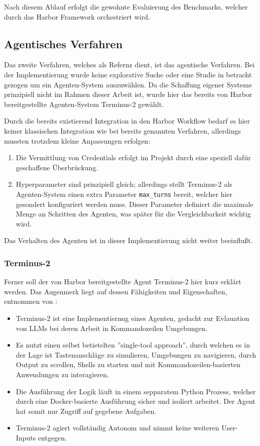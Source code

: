 Nach diesem Ablauf erfolgt die gewohnte Evaluierung des Benchmarks, welcher durch das Harbor Framework orchestriert wird.

\subsection{Agentisches Verfahren}\label{ch:Impl:Agentisches Verfahren}

Das zweite Verfahren, welches als Refernz dient, ist das agentische Verfahren. Bei der Implementierung wurde keine explorative Suche oder eine Studie in betracht gezogen um ein Agenten-System auszuwählen. Da die Schaffung eigener Systeme prinzipiell nicht im Rahmen dieser Arbeit ist, wurde hier das bereits von Harbor bereitgestellte Agenten-System Terminus-2 \cite{Terminus2} gewählt.

Durch die bereits existierend Integration in den Harbor Workflow bedarf es hier keiner klassischen Integration wie bei bereits genannten Verfahren, allerdings mussten trotzdem kleine Anpassungen erfolgen:

\begin{enumerate}
    \item Die Vermittlung von Credentials erfolgt im Projekt durch eine speziell dafür geschaffene Überbrückung.
    \item Hyperparameter sind prinzipiell gleich; allerdings stellt Terminus-2 als Agenten-System einen extra Parameter \texttt{max\_turns} bereit, welcher hier gesondert konfiguriert werden muss. Dieser Parameter definiert die maximale Menge an Schritten des Agenten, was später für die Vergleichbarkeit wichtig wird.
\end{enumerate}

Das Verhalten des Agenten ist in dieser Implementierung nicht weiter beeinflußt.

\subsubsection{Terminus-2}

Ferner soll der von Harbor bereitgestellte Agent Terminus-2 hier kurz erklärt werden. Das Augenmerk liegt auf dessen Fähigkeiten und Eigenschaften, entnommen von \cite{Terminus2}:

\begin{itemize}
    \item Terminus-2 ist eine Implementiernug eines Agenten, gedacht zur Evlauation von LLMs bei deren Arbeit in Kommandozeilen Umgebungen.
    \item Es nutzt einen selbst betietelten ''single-tool approach'', durch welchen es in der Lage ist Tastenanschläge zu simulieren, Umgebungen zu navigieren, durch Output zu scrollen, Shells zu starten und mit Kommandozeilen-basierten Anwendungen zu interagieren.
    \item Die Ausführung der Logik läuft in einem sepparatem Python Prozess, welcher durch eine Docker-basierte Ausführung sicher und isoliert arbeitet. Der Agent hat somit nur Zugriff auf gegebene Aufgaben.
    \item Terminus-2 agiert vollständig Autonom und nimmt keine weiteren User-Inputs entgegen.
\end{itemize}

